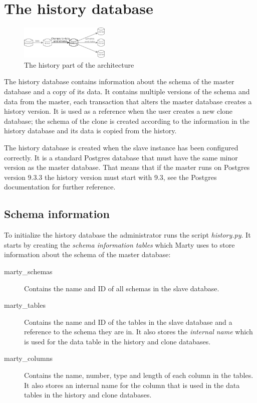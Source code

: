 \section{The history database}

\begin{figure}
  \vspace{-20pt}
  \begin{center}
    \includegraphics[width=0.38\textwidth]{img/architecture-history}
  \end{center}
  \vspace{-20pt}
  \caption{The history part of the architecture}
  \vspace{-10pt}
\end{figure}

The history database contains information about the schema of the master database and a copy of its data.
It contains multiple versions of the schema and data from the master, each transaction that alters the master database creates a history version.
It is used as a reference when the user creates a new clone database; the schema of the clone is created according to the information in the history database and its data is copied from the history.

The history database is created when the slave instance has been configured correctly.
It is a standard Postgres database that must have the same minor version as the master database.
That means that if the master runs on Postgres version 9.3.3 the history version must start with 9.3, see the Postgres documentation for further reference. %

\subsection{Schema information}
To initialize the history database the administrator runs the script \textit{history.py}.
It starts by creating the \textit{schema information tables} which Marty uses to store information about the schema of the master database:

\begin{description}
  \item[marty\_schemas]
    Contains the name and ID of all schemas in the slave database.
  \item[marty\_tables]
    Contains the name and ID of the tables in the slave database and a reference to the schema they are in.
    It also stores the \textit{internal name} which is used for the data table in the history and clone databases.
  \item[marty\_columns]
    Contains the name, number, type and length of each column in the tables.
    It also stores an internal name for the column that is used in the data tables in the history and clone databases.
\end{description}

